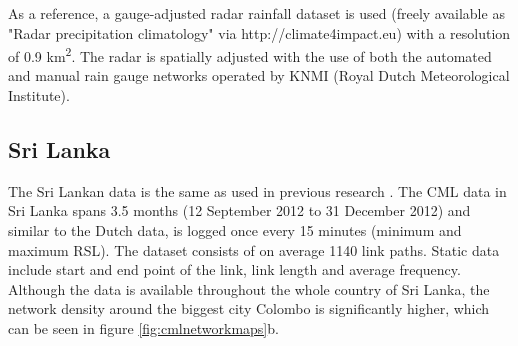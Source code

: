\documentclass[twocolumn, 10pt, a4paper]{article}
\begin{document}
	As a reference, a gauge-adjusted radar rainfall dataset is used (freely available as "Radar precipitation climatology" via http://climate4impact.eu) with a resolution of 0.9 km\textsuperscript{2}. The radar is spatially adjusted with the use of both the automated and  manual rain gauge networks operated by KNMI (Royal Dutch Meteorological Institute).
	
	
	\subsection{Sri Lanka}
	The Sri Lankan data is the same as used in previous research \cite{Overeem2021}.
	The CML data in Sri Lanka spans 3.5 months (12 September 2012 to 31 December 2012) and similar to the Dutch data, is logged once every 15 minutes (minimum and maximum RSL). The dataset consists of on average 1140 link paths. Static data include start and end point of the link, link length and average frequency. Although the data is available throughout the whole country of Sri Lanka, the network density around the biggest city Colombo is significantly higher, which can be seen in figure \ref{fig:cmlnetworkmaps}b.
	
	
	
\end{document}
